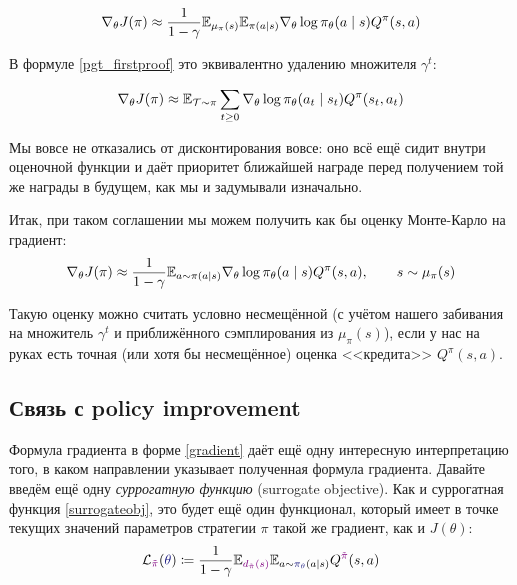 \begin{equation*}
\nabla_{\theta} J(\pi) \approx \frac{1}{1 - \gamma}\mathbb{E}_{\mu_\pi(s)} \mathbb{E}_{\pi(a \mid s)} \nabla_{\theta} \log \pi_\theta (a \mid s) Q^{\pi}(s, a)
\end{equation*}

В формуле \eqref{pgt_firstproof} это эквивалентно удалению множителя $\gamma^t$:

\begin{equation*}
\nabla_{\theta} J(\pi) \approx \mathbb{E}_{\mathcal{T} \sim \pi} \sum_{t \ge 0} \nabla_{\theta} \log \pi_\theta (a_t \mid s_t) Q^{\pi}(s_t, a_t)
\end{equation*}

Мы вовсе не отказались от дисконтирования вовсе: оно всё ещё сидит внутри оценочной функции и даёт приоритет ближайшей награде перед получением той же награды в будущем, как мы и задумывали изначально.

Итак, при таком соглашении мы можем получить как бы оценку Монте-Карло на градиент:
$$\nabla_{\theta} J(\pi) \approx \frac{1}{1 - \gamma}\mathbb{E}_{a \sim \pi(a \mid s)} \nabla_{\theta} \log \pi_\theta (a \mid s) Q^{\pi}(s, a), \qquad s \sim \mu_\pi(s)$$

Такую оценку можно считать условно несмещённой (с учётом нашего забивания на множитель $\gamma^t$ и приближённого сэмплирования из $\mu_{\pi}(s)$), если у нас на руках есть точная (или хотя бы несмещённое) оценка <<кредита>> $Q^\pi(s, a)$.

\subsection{Связь с policy improvement}\label{subsec:pg_is_pi}

Формула градиента в форме \eqref{gradient} даёт ещё одну интересную интерпретацию того, в каком направлении указывает полученная формула градиента. Давайте введём ещё одну \emph{суррогатную функцию} (surrogate objective). Как и суррогатная функция \eqref{surrogateobj}, это будет ещё один функционал, который имеет в точке текущих значений параметров стратегии $\pi$ такой же градиент, как и $J(\theta)$:
\begin{equation}\label{PGisPI}
\mathcal{L}_{\textcolor{ChadPurple}{\tilde{\pi}}}(\textcolor{ChadBlue}{\theta}) \coloneqq \frac{1}{1 - \gamma}\E_{\textcolor{ChadPurple}{d_{\tilde{\pi}}(s)}} \E_{a \sim \textcolor{ChadBlue}{\pi_{\theta}}(a \mid s)} Q^{\textcolor{ChadPurple}{\tilde{\pi}}}(s, a)
\end{equation}

